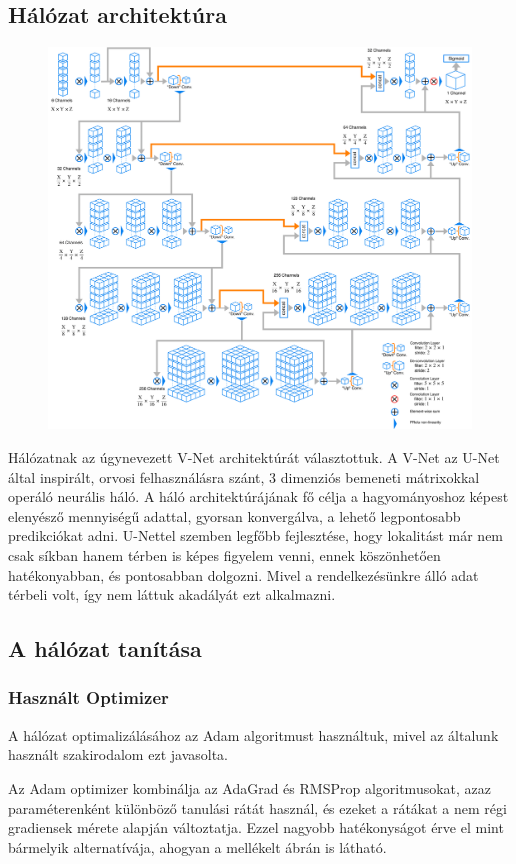 \documentclass[a4paper]{article}
\begin{document}
	\subsection*{Hálózat architektúra}
		\begin{figure}
		\centering
		\includegraphics[width=0.7\linewidth]{"VNetDiagram"}
		\caption[A V-Net felépítése]{}
		\label{fig:vnetdiagram}
	\end{figure}
	Hálózatnak az úgynevezett V-Net \cite{2016arXiv160604797M} architektúrát választottuk. A V-Net az U-Net\cite{2015arXiv150504597R} által inspirált, orvosi felhasználásra szánt, 3 dimenziós bemeneti mátrixokkal operáló neurális háló.  A háló architektúrájának fő célja a hagyományoshoz képest elenyésző mennyiségű adattal, gyorsan konvergálva, a lehető legpontosabb predikciókat adni. U-Nettel szemben legfőbb fejlesztése, hogy lokalitást már nem csak síkban hanem térben is képes figyelem venni, ennek köszönhetően hatékonyabban, és pontosabban dolgozni. Mivel a rendelkezésünkre álló adat térbeli volt, így nem láttuk akadályát ezt alkalmazni.
	
	\subsection* {A hálózat tanítása}
	\subsubsection*{Használt Optimizer}
	A hálózat optimalizálásához az Adam\cite{2014arXiv1412.6980K} algoritmust használtuk, mivel az általunk használt szakirodalom\cite{AdamTutorial1} ezt javasolta.
	
	Az Adam optimizer kombinálja az AdaGrad és RMSProp algoritmusokat, azaz paraméterenként különböző tanulási rátát használ, és ezeket a rátákat a nem régi gradiensek mérete alapján változtatja. Ezzel nagyobb hatékonyságot érve el mint bármelyik alternatívája, ahogyan a mellékelt ábrán is látható.
\end{document}
